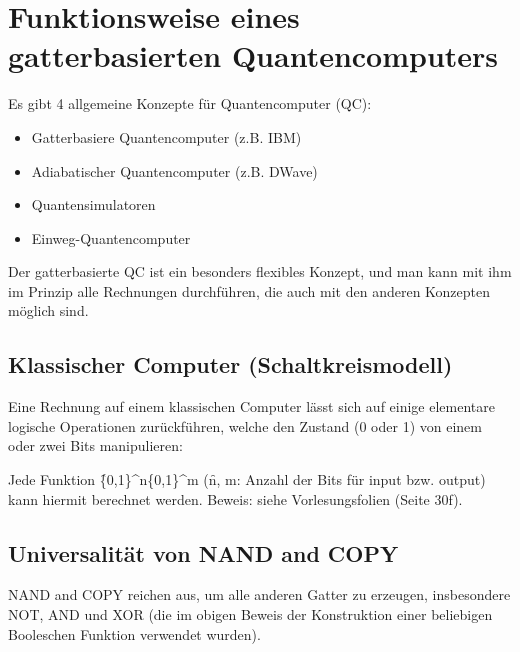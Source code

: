 \section{Funktionsweise eines gatterbasierten Quantencomputers}
Es gibt 4 allgemeine Konzepte für Quantencomputer (QC):
\begin{itemize}
    \item Gatterbasiere Quantencomputer (z.B. IBM)
    \item Adiabatischer Quantencomputer (z.B. DWave)
    \item Quantensimulatoren
    \item Einweg-Quantencomputer
\end{itemize}
Der gatterbasierte QC ist ein besonders flexibles Konzept, und man kann mit ihm im Prinzip alle Rechnungen durchführen, die auch mit den anderen Konzepten möglich sind.

\subsection{Klassischer Computer (Schaltkreismodell)}
Eine Rechnung auf einem klassischen Computer lässt sich auf einige elementare logische Operationen zurückführen, welche den Zustand (0 oder 1) von einem oder zwei Bits manipulieren:


Jede Funktion \f{\left\{0,1\right\}^n\rightarrow\left\{0,1\right\}^m} (\f{n, m}: Anzahl der Bits für input bzw. output) kann hiermit berechnet werden. Beweis: siehe Vorlesungsfolien (Seite 30f).


\subsection{Universalität von NAND and COPY}
NAND and COPY reichen aus, um alle anderen Gatter zu erzeugen, insbesondere NOT, AND und XOR (die im obigen Beweis der Konstruktion einer beliebigen Booleschen Funktion verwendet wurden).


